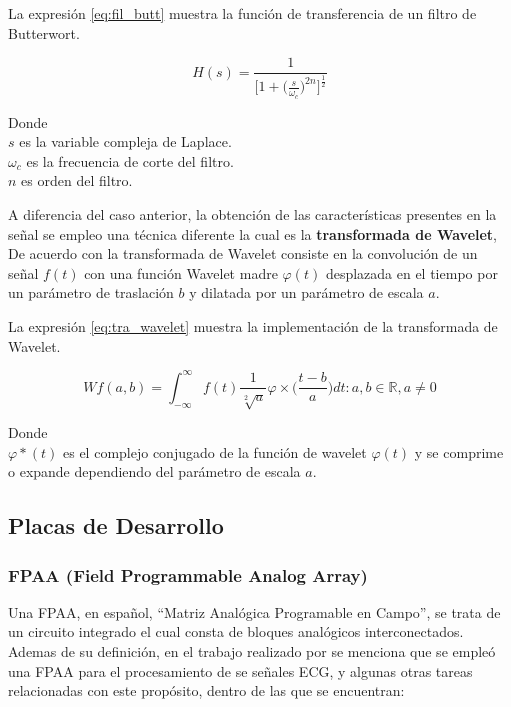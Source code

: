 \begin{itemize}
        La expresión \ref{eq:fil_butt} muestra la función de transferencia de un filtro de Butterwort.

        \begin{equation}
            H(s) = \frac{1}{\biggl[1 + \biggl(\frac{s}{\omega_c}\biggr)^{2n}\biggr]^{\frac{1}{2}}}
            \label{eq:fil_butt}
        \end{equation}

        Donde\\
        \noindent
        $s$ es la variable compleja de Laplace.\\
        $\omega_c$ es la frecuencia de corte del filtro.\\
        $n$ es orden del filtro.\\
        

    \end{itemize}
    A diferencia del caso anterior, la obtención de las características presentes en la señal se empleo una técnica diferente la cual es la \textbf{transformada de Wavelet}, De acuerdo con \citet[p. 271]{bib9} la transformada de Wavelet consiste en la convolución de un señal $f(t)$ con una función Wavelet madre $\varphi(t)$ desplazada en el tiempo por un parámetro de traslación $b$ y dilatada por un parámetro de escala $a$.

    La expresión \ref{eq:tra_wavelet} muestra la implementación de la transformada de Wavelet.

    \begin{equation}
        Wf(a, b) = \int_{-\infty}^{\infty} f(t) {\frac{1}{\sqrt[2]{a}}\varphi \times \biggl(\frac{t-b}{a}\biggr)dt} : a, b \in \mathbb{R}, a \ne 0
        \label{eq:tra_wavelet}
    \end{equation}

    Donde\\
    \noindent
    $\varphi * (t)$ es el complejo conjugado de la función de wavelet $\varphi(t)$ y se comprime o expande dependiendo del parámetro de escala $a$.

    \subsection{Placas de Desarrollo}

    \subsubsection{FPAA (Field Programmable Analog Array)}
    Una FPAA, en español, ``Matriz Analógica Programable en Campo'', se trata de un circuito integrado el cual consta de bloques analógicos interconectados. Ademas de su definición, en el trabajo realizado por \citet[p. 3]{bib2} se menciona que se empleó una FPAA para el procesamiento de se señales ECG, y algunas otras tareas relacionadas con este propósito, dentro de las que se encuentran: 
    
